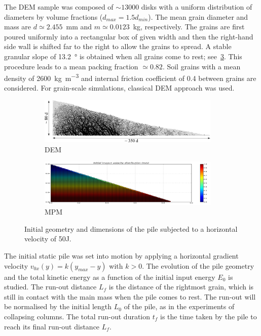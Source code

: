 \documentclass[3p,times,procedia,number]{elsarticle}
\begin{document}
The DEM sample was composed of $\sim13000$ disks with a uniform distribution of 
diameters by volume fractions ($d_{max} = 1.5 d_{min}$). The mean grain 
diameter and mass are $d\simeq 2.455 $~\si{\mm} and $m\simeq 0.0123$~\si{\kg}, 
respectively. The grains are first poured uniformly into a rectangular box of 
given width and then the right-hand side wall is shifted far to the right 
to allow the grains to spread. A stable granular slope of 13.2~\si{\degree} is 
obtained when all grains come to rest; see~\cref{fig:slope_configuration}. This 
procedure leads to a mean packing fraction $\simeq 0.82$. Soil grains with a 
mean density of 2600~\si{\kg\per\m\cubed} and internal friction coefficient of 
0.4 between grains are considered. For grain-scale simulations, classical DEM
approach was used. 

\begin{figure}[tbhp]
  \centering
  \begin{subfigure}[b]{0.47\textwidth}
    \centering
    \includegraphics[width=0.95\textwidth]{figs/slope_configuration}
    \caption{DEM}
    \label{fig:dem_slope_configuration}
  \end{subfigure}
  \begin{subfigure}[b]{0.47\textwidth}
    \centering
    \includegraphics[width=0.95\textwidth]{figs/mpm_velocity_slope}
    \caption{MPM}
    \label{fig:mpm_slope_setup}
  \end{subfigure}
  \caption{Initial geometry and dimensions of the pile subjected to a horizontal 
    velocity of 50J.}
  \label{fig:slope_configuration}
\end{figure}

The initial static pile was set into motion by applying a horizontal
gradient velocity $v_{0x}(y) = k (y_{max} - y)$ with $k>0$. The evolution of 
the pile geometry and the total kinetic energy as a function of the initial 
input energy $E_0$ is studied. The run-out distance $L_f$ is the distance of 
the rightmost grain, which is still in contact with the main mass when the pile 
comes to rest. The run-out will be normalised by the initial length $L_0$ of 
the pile, as in the experiments of collapsing columns. The total run-out 
duration $t_f$ is the time taken by the pile to reach its final run-out 
distance $L_f$.
\end{document}
